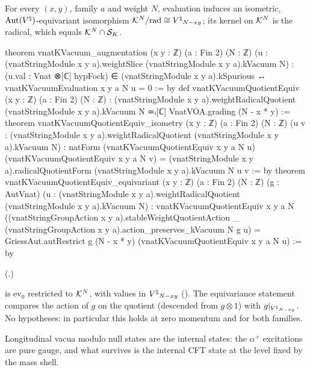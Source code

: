 \begin{theorem}\label{ch18:thm:kquotient}
For every $(x,y)$, family $a$ and weight $N$, evaluation induces an isometric, $\operatorname{Aut}({V^{\natural}})$-equivariant
isomorphism $\mathcal{K}^N/\mathrm{rad}\cong{V^{\natural}}_{N-xy}$; its kernel on $\mathcal{K}^N$ is the radical, which equals
$\mathcal{K}^N\cap\mathcal{S}_K$.
\end{theorem}
\begin{leancode}
theorem vnatKVacuum_augmentation (x y : ℤ) (a : Fin 2) (N : ℤ)
    (u : (vnatStringModule x y a).weightSlice (vnatStringModule x y a).kVacuum N) :
    (u.val : Vnat ⊗[ℂ] hypFock) ∈ (vnatStringModule x y a).kSpurious ↔
      vnatKVacuumEvaluation x y a N u = 0 := by
def vnatKVacuumQuotientEquiv (x y : ℤ) (a : Fin 2) (N : ℤ) :
    (vnatStringModule x y a).weightRadicalQuotient (vnatStringModule x y a).kVacuum N ≃ₗ[ℂ]
      VnatVOA.grading (N - x * y) :=
theorem vnatKVacuumQuotientEquiv_isometry (x y : ℤ) (a : Fin 2) (N : ℤ)
    (u v : (vnatStringModule x y a).weightRadicalQuotient (vnatStringModule x y a).kVacuum N) :
    natForm (vnatKVacuumQuotientEquiv x y a N u) (vnatKVacuumQuotientEquiv x y a N v) =
      (vnatStringModule x y a).radicalQuotientForm (vnatStringModule x y a).kVacuum N u v := by
theorem vnatKVacuumQuotientEquiv_equivariant (x y : ℤ) (a : Fin 2) (N : ℤ) (g : AutVnat)
    (u : (vnatStringModule x y a).weightRadicalQuotient (vnatStringModule x y a).kVacuum N) :
    vnatKVacuumQuotientEquiv x y a N
      ((vnatStringGroupAction x y a).stableWeightQuotientAction _
        (vnatStringGroupAction x y a).action_preserves_kVacuum N g u) =
      GriessAut.autRestrict g (N - x * y) (vnatKVacuumQuotientEquiv x y a N u) := by
\end{leancode}
(.)
\begin{dictionary}
 is $\mathrm{ev}_0$ restricted to $\mathcal{K}^N$, with values in
${V^{\natural}}_{N-xy}$ ().  The equivariance statement compares the action of $g$ on the
quotient (descended from $g\otimes1$) with $g|_{{V^{\natural}}_{N-xy}}$.  No hypotheses: in particular this holds
at zero momentum and for both families.
\end{dictionary}
\begin{physics}
Longitudinal vacua modulo null states are the internal states: the $\alpha^+$ excitations are pure
gauge, and what survives is the internal CFT state at the level fixed by the mass shell.
\end{physics}
